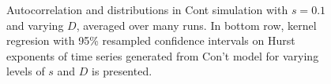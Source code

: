 \documentclass[runningheads]{llncs}
\begin{document}
\begin{figure}[htbp]
\begin{center}
    \caption{Autocorrelation and distributions in Cont simulation with $s=0.1$ and varying $D$, averaged over many runs. In bottom row, kernel regresion with 95\% resampled confidence intervals on Hurst exponents of time series generated from Con't model for varying levels of $s$ and $D$ is presented.}
    \label{fig:ContMultiRun}
  \end{center}
\end{figure}



\end{document}
